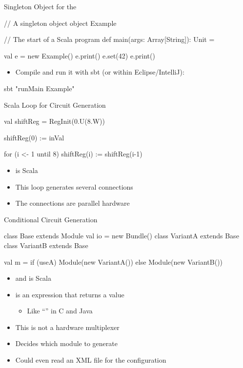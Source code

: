 \begin{frame}[fragile]{Singleton Object for the }
\begin{chisel}
// A singleton object
object Example {
  
  // The start of a Scala program
  def main(args: Array[String]): Unit = {
    
    val e = new Example()
    e.print()
    e.set(42)
    e.print()
  }
}
\end{chisel}
\begin{itemize}
\item Compile and run it with sbt (or within Eclipse/IntelliJ):
\end{itemize}
\begin{chisel}
sbt "runMain Example"
\end{chisel}
\end{frame}





\begin{frame}[fragile]{Scala  Loop for Circuit Generation}
\begin{chisel}
val shiftReg = RegInit(0.U(8.W))

shiftReg(0) := inVal

for (i <- 1 until 8) {
  shiftReg(i) := shiftReg(i-1)
}
\end{chisel}
\begin{itemize}
\item {} is Scala
\item This loop generates several connections
\item The connections are parallel hardware
\end{itemize}
\end{frame}

\begin{frame}[fragile]{Conditional Circuit Generation}
\begin{chisel}
class Base extends Module { val io = new Bundle() }
class VariantA extends Base { }
class VariantB extends Base { }

val m = if (useA) Module(new VariantA())
        else Module(new VariantB())
\end{chisel}
\begin{itemize}
\item {} and  is Scala
\item {} is an expression that returns a value
\begin{itemize}
\item Like ``'' in C and Java
\end{itemize}
\item This is not a hardware multiplexer
\item Decides which module to generate
\item Could even read an XML file for the configuration
\end{itemize}
\end{frame}

